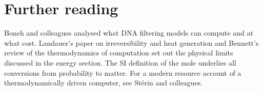 \section*{Further reading}
Boneh and colleagues analysed what DNA filtering models can compute and at what
cost.\cite{Boneh1996} Landauer's paper on irreversibility and heat
generation\cite{Landauer1961} and Bennett's review of the thermodynamics of
computation\cite{Bennett1982} set out the physical limits discussed in the
energy section. The SI definition of the mole underlies all conversions from
probability to matter.\cite{BIPMmole} For a modern resource account of a
thermodynamically driven computer, see St\'erin and colleagues.\cite{Sterin2026}
